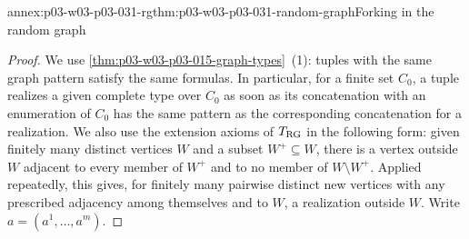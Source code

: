 \begin{annexitem}{annex:p03-w03-p03-031-rg}{thm:p03-w03-p03-031-random-graph}{Forking in the random graph}
\begin{proof}
We use \cref{thm:p03-w03-p03-015-graph-types}~(1): tuples with the same
graph pattern satisfy the same formulas.  In particular, for a finite set
\(C_0\), a tuple realizes a given complete type over \(C_0\) as soon as its
concatenation with an enumeration of \(C_0\) has the same pattern as the
corresponding concatenation for a realization.  We also use the extension
axioms of \(T_{\rm RG}\) in the following form: given finitely many
distinct vertices \(W\) and a subset \(W^+\subseteq W\), there is a vertex
outside \(W\) adjacent to every member of \(W^+\) and to no member of
\(W\setminus W^+\).  Applied repeatedly, this gives, for finitely many
pairwise distinct new vertices with any prescribed adjacency among
themselves and to \(W\), a realization outside \(W\).  Write
\(a=(a^1,\ldots,a^m)\).


\end{proof}
\end{annexitem}
